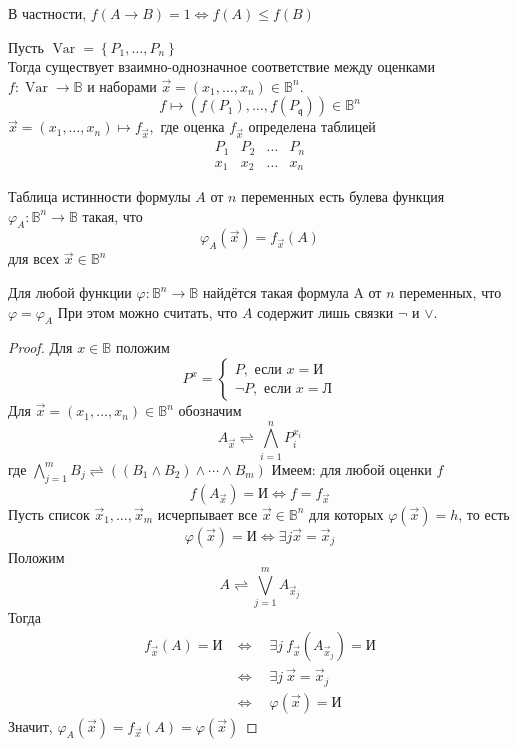 В частности, $f(A \rightarrow B)=1 \Longleftrightarrow f(A) \leq f(B)$
\vskip 0.2in
\begin{lem}
Пусть $\operatorname{Var}=\left\{P_{1}, \ldots, P_{n}\right\}$\\
Тогда существует взаимно-однозначное соответствие между оценками $f: \operatorname{Var} \rightarrow \mathbb{B}$ и наборами $\vec{x}=\left(x_{1}, \ldots, x_{n}\right) \in \mathbb{B}^{n}$.
$$
f \longmapsto\left(f\left(P_{1}\right), \ldots, f\left(P_{\mathfrak{q}}\right)\right) \in \mathbb{B}^{n}
$$
$\vec{x}=\left(x_{1}, \ldots, x_{n}\right) \longmapsto f_{\vec{x}},$ где оценка $f_{\vec{x}}$ определена таблицей
$$
\begin{array}{c|c|c|c}
P_{1} & P_{2} & \ldots & P_{n} \\
\hline x_{1} & x_{2} & \ldots & x_{n}
\end{array}
$$
\end{lem}
\vskip 0.2in
\begin{defn}
Таблица истинности формулы $A$ от $n$ переменных есть булева функция $\varphi_{A}: \mathbb{B}^{n} \rightarrow \mathbb{B}$ такая, что
$$
\varphi_{A}(\vec{x})=f_{\vec{x}}(A)
$$
для всех $\vec{x} \in \mathbb{B}^{n}$
\end{defn}
\vskip 0.2in
\begin{theo}
Для любой функции $\varphi: \mathbb{B}^{n} \rightarrow \mathbb{B}$ найдётся такая формула A от $n$ переменных, что $\varphi=\varphi_{A}$ При этом можно считать, что $A$ содержит лишь связки $\neg$ и $\vee$.
\end{theo}
\begin{proof}
Для $x \in \mathbb{B}$ положим
$$
P^{x}=
\begin{cases}
P,\text { если } x=\text{И} \\
\neg P, \text { если } x=\text{Л}
\end{cases}
$$
Для $\vec{x}=\left(x_{1}, \ldots, x_{n}\right) \in \mathbb{B}^{n}$ обозначим
$$
A_{\vec{x}} \rightleftharpoons \bigwedge_{i=1}^{n} P_{i}^{x_{i}}
$$
где $\bigwedge_{j=1}^{m} B_{j} \rightleftharpoons\left(\left(B_{1} \wedge B_{2}\right) \wedge \cdots \wedge B_{m}\right)$
Имеем: для любой оценки $f$
$$
f\left(A_{\vec{x}}\right)=\text{И} \Longleftrightarrow f=f_{\vec{x}}
$$
Пусть список $\vec{x}_{1}, \ldots, \vec{x}_{m}$ исчерпывает все $\vec{x} \in \mathbb{B}^{n}$ для которых $\varphi(\vec{x})=h$, то есть
$$
\varphi(\vec{x})=\text{И} \Longleftrightarrow \exists j \vec{x}=\vec{x}_{j}
$$
Положим
$$
A \rightleftharpoons \bigvee_{j=1}^{m} A_{\vec{x}_{j}}
$$
Тогда
$$
\begin{array}{ll}
f_{\vec{x}}(A)=\text{И} & \Longleftrightarrow \quad \exists j\ f_{\vec{x}} \left(A_{\vec{x}_{j}}\right)=\text{И}\\
&\Longleftrightarrow \quad \exists j\ \vec{x} = \vec{x}_{j}\\
&\Longleftrightarrow \quad \varphi(\vec{x})=\text{И}
\end{array}
$$
Значит, $\varphi_{A}(\vec{x})=f_{\vec{x}}(A)= \varphi(\vec{x})$
\end{proof}

